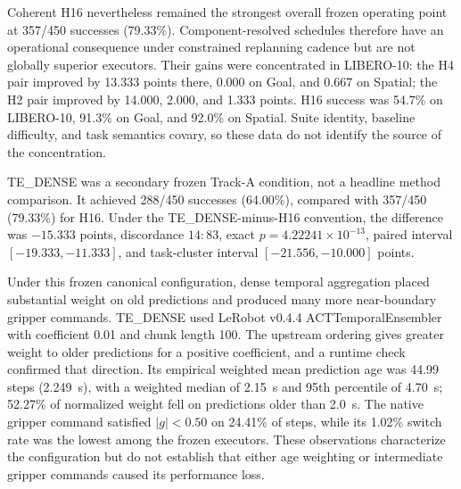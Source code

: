 Coherent H16 nevertheless remained the strongest overall frozen operating
point at 357/450 successes (79.33\%). Component-resolved schedules therefore
have an operational consequence under constrained replanning cadence but are
not globally superior executors. Their gains were concentrated in LIBERO-10:
the H4 pair improved by 13.333 points there, 0.000 on Goal, and 0.667 on
Spatial; the H2 pair improved by 14.000, 2.000, and 1.333 points. H16 success
was 54.7\% on LIBERO-10, 91.3\% on Goal, and 92.0\% on Spatial. Suite identity,
baseline difficulty, and task semantics covary, so these data do not identify
the source of the concentration.

TE\_DENSE was a secondary frozen Track-A condition, not a headline method
comparison. It achieved 288/450 successes (64.00\%), compared with 357/450
(79.33\%) for H16. Under the TE\_DENSE-minus-H16 convention, the difference was
$-15.333$ points, discordance $14{:}83$, exact
$p=4.22241\times10^{-13}$, paired interval
$[-19.333,-11.333]$, and task-cluster interval $[-21.556,-10.000]$ points.

Under this frozen canonical configuration, dense temporal aggregation placed
substantial weight on old predictions and produced many more near-boundary
gripper commands. TE\_DENSE used LeRobot v0.4.4 ACTTemporalEnsembler with
coefficient 0.01 and chunk length 100. The upstream ordering gives greater
weight to older predictions for a positive coefficient, and a runtime check
confirmed that direction. Its empirical weighted mean prediction age was
44.99 steps (2.249~s), with a weighted median of 2.15~s and 95th percentile of
4.70~s; 52.27\% of normalized weight fell on predictions older than 2.0~s.
The native gripper command satisfied $|g|<0.50$ on 24.41\% of steps, while its
1.02\% switch rate was the lowest among the frozen executors. These
observations characterize the configuration but do not establish that either
age weighting or intermediate gripper commands caused its performance loss.
